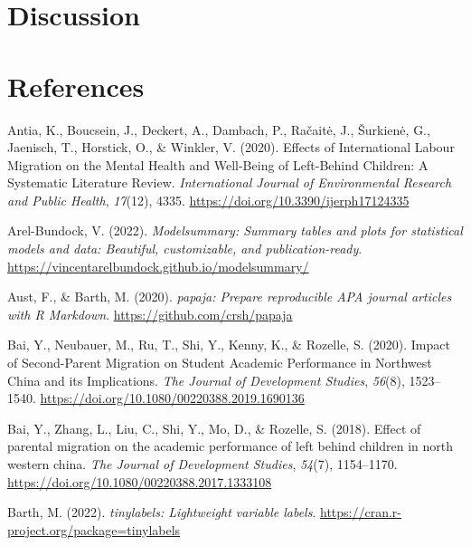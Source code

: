 \documentclass[
  man,floatsintext]{apa7}
\newlength{\cslhangindent}
\newlength{\cslentryspacingunit} %
\newenvironment{CSLReferences}[2] %
 {%
  \setlength{\parindent}{0pt}
  \ifodd #1
  \let\oldpar\par
  \def\par{\hangindent=\cslhangindent\oldpar}
  \fi
  \setlength{\parskip}{#2\cslentryspacingunit}
 }%
 {}
\begin{document}
\newpage

\hypertarget{discussion}{%
\section{Discussion}\label{discussion}}

\newpage

\hypertarget{references}{%
\section{References}\label{references}}

\hypertarget{refs}{}
\begin{CSLReferences}{1}{0}
\leavevmode{}%
Antia, K., Boucsein, J., Deckert, A., Dambach, P., Račaitė, J., Šurkienė, G., Jaenisch, T., Horstick, O., \& Winkler, V. (2020). Effects of International Labour Migration on the Mental Health and Well-Being of Left-Behind Children: A Systematic Literature Review. \emph{International Journal of Environmental Research and Public Health}, \emph{17}(12), 4335. \url{https://doi.org/10.3390/ijerph17124335}

\leavevmode{}%
Arel-Bundock, V. (2022). \emph{Modelsummary: Summary tables and plots for statistical models and data: Beautiful, customizable, and publication-ready}. \url{https://vincentarelbundock.github.io/modelsummary/}

\leavevmode{}%
Aust, F., \& Barth, M. (2020). \emph{{papaja}: {Prepare} reproducible {APA} journal articles with {R Markdown}}. \url{https://github.com/crsh/papaja}

\leavevmode{}%
Bai, Y., Neubauer, M., Ru, T., Shi, Y., Kenny, K., \& Rozelle, S. (2020). Impact of Second-Parent Migration on Student Academic Performance in Northwest China and its Implications. \emph{The Journal of Development Studies}, \emph{56}(8), 1523--1540. \url{https://doi.org/10.1080/00220388.2019.1690136}

\leavevmode{}%
Bai, Y., Zhang, L., Liu, C., Shi, Y., Mo, D., \& Rozelle, S. (2018). Effect of parental migration on the academic performance of left behind children in north western china. \emph{The Journal of Development Studies}, \emph{54}(7), 1154--1170. \url{https://doi.org/10.1080/00220388.2017.1333108}

\leavevmode{}%
Barth, M. (2022). \emph{{tinylabels}: Lightweight variable labels}. \url{https://cran.r-project.org/package=tinylabels}


\end{CSLReferences}
\end{document}
